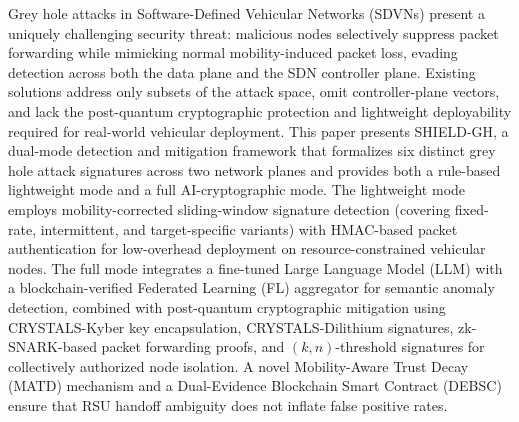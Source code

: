 \documentclass[12pt, a4paper]{report}
\begin{document}
Grey hole attacks in Software-Defined Vehicular Networks (SDVNs) present a
uniquely challenging security threat: malicious nodes selectively suppress
packet forwarding while mimicking normal mobility-induced packet loss, evading
detection across both the data plane and the SDN controller plane. Existing
solutions address only subsets of the attack space, omit controller-plane
vectors, and lack the post-quantum cryptographic protection and lightweight
deployability required for real-world vehicular deployment. This paper presents
SHIELD-GH, a dual-mode detection and mitigation framework that formalizes six
distinct grey hole attack signatures across two network planes and provides
both a rule-based lightweight mode and a full AI-cryptographic mode. The
lightweight mode employs mobility-corrected sliding-window signature detection
(covering fixed-rate, intermittent, and target-specific variants) with HMAC-based packet authentication for low-overhead deployment on resource-constrained vehicular nodes. The full mode integrates a fine-tuned Large Language Model (LLM) with a blockchain-verified Federated Learning (FL) aggregator for semantic anomaly detection, combined with post-quantum cryptographic mitigation using CRYSTALS-Kyber key encapsulation, CRYSTALS-Dilithium signatures, zk-SNARK-based packet forwarding proofs, and $(k,n)$-threshold signatures for collectively authorized node isolation. A novel Mobility-Aware Trust Decay (MATD) mechanism and a Dual-Evidence Blockchain Smart Contract (DEBSC) ensure that RSU handoff ambiguity does not inflate false positive rates. 



\newpage

\tableofcontents
\newpage

\listoffigures
\newpage

\listoftables
\newpage

\acuseall %
\printacronyms
\newpage
\end{document}
